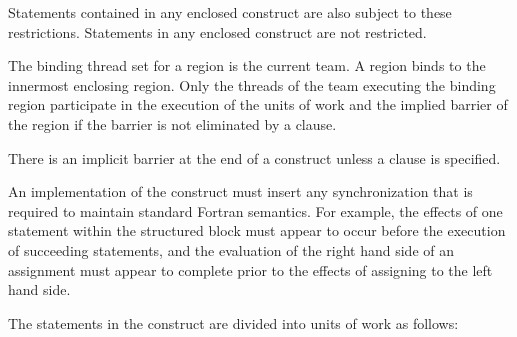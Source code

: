 Statements contained in any enclosed  construct are also subject to these 
restrictions. Statements in any enclosed  construct are not restricted.

\binding
The binding thread set for a  region is the current team. A  
region binds to the innermost enclosing  region. Only the threads of the team 
executing the binding  region participate in the execution of the units of 
work and the implied barrier of the  region if the barrier is not eliminated 
by a  clause.
\begin{figure}[t!]
\end{figure}

\descr
There is an implicit barrier at the end of a  construct unless a  
clause is specified.

An implementation of the  construct must insert any synchronization that is 
required to maintain standard Fortran semantics. For example, the effects of one 
statement within the structured block must appear to occur before the execution of 
succeeding statements, and the evaluation of the right hand side of an assignment must 
appear to complete prior to the effects of assigning to the left hand side.

The statements in the  construct are divided into units of work as follows:

